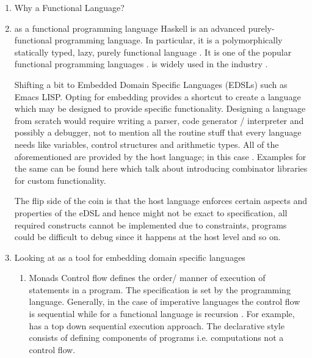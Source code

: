 \documentclass[thesis-solanki.tex]{subfiles}
\begin{document}
\begin{enumerate}

\item Why a Functional Language?

\item
   as a functional programming language Haskell is an advanced purely-functional programming
  language.
  In particular, it is a polymorphically statically typed, lazy, purely functional language
  \cite{website:haskellwiki}.
  It is one of the popular functional programming languages \cite{website:langpop}.
   is widely used in the industry \cite{website:haskellinindustry}.

  Shifting a bit to Embedded Domain Specific Languages (EDSLs) such as Emacs LISP.
  Opting for embedding provides a shortcut to create a language which may be designed to provide specific
  functionality.
  Designing a language from scratch would require writing a parser, code generator / interpreter and possibly a
  debugger, not to mention all the routine stuff that every language
  needs like variables, control structures and 
  arithmetic types.
  All of the aforementioned are provided by the host language; in this case .
  Examples for the same can be found here \cite{jones2001composing, meyer2008eiffel} which talk about introducing
  combinator libraries for custom functionality.

  The flip side of the coin is that the host language enforces certain aspects and properties of the eDSL and hence
  might not be exact to specification, all required constructs cannot be implemented due to constraints, programs
  could be difficult to debug since it happens at the host level and so on.

\item Looking at  as a tool for embedding domain specific languages\cite{website:paulspontifications}

\begin{enumerate}
\item Monads
\newline
Control flow defines the order/ manner of execution of statements in a pro\-gram\cite{website:controlflowwiki}.
The specification is set by the programming language.
Generally, in the case of imperative languages the control flow is sequential while for a functional language is
recursion \cite{website:controlflowdalhousie}.
For example,  has a top down sequential execution approach.
The declarative style consists of defining components of programs i.e.
computations not a control flow\cite{website:declarativeprogrammingwiki}.


\end{enumerate}
\end{enumerate}
\end{document}
